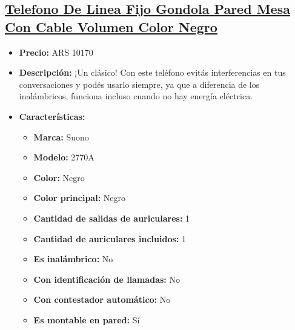 \documentclass{article}
\begin{document}
\begin{adjustwidth}{2em}{}

\subsection{\uline{\href{https://www.mercadolibre.com.ar/telefono-de-linea-fijo-gondola-pared-mesa-con-cable-volumen-color-negro/p/MLA19830945}{Telefono De Linea Fijo Gondola Pared Mesa Con Cable Volumen Color Negro}}}
\begin{itemize}
    \item \textbf{Precio:} ARS 10170
    \item \textbf{Descripción:} ¡Un clásico! Con este teléfono evitás interferencias en tus conversaciones y podés usarlo siempre, ya que a diferencia de los inalámbricos, funciona incluso cuando no hay energía eléctrica.
    \item \textbf{Características:} 
    \begin{itemize}
        \item \textbf {Marca:} Suono
    \item \textbf {Modelo:} 2770A
    \item \textbf {Color:} Negro
    \item \textbf {Color principal:} Negro
    \item \textbf {Cantidad de salidas de auriculares:} 1
    \item \textbf {Cantidad de auriculares incluidos:} 1
    \item \textbf {Es inalámbrico:} No
    \item \textbf {Con identificación de llamadas:} No
    \item \textbf {Con contestador automático:} No
    \item \textbf {Es montable en pared:} Sí
    \end{itemize}
\end{itemize}

\vspace{1\baselineskip} %
\end{adjustwidth}
\end{document}
